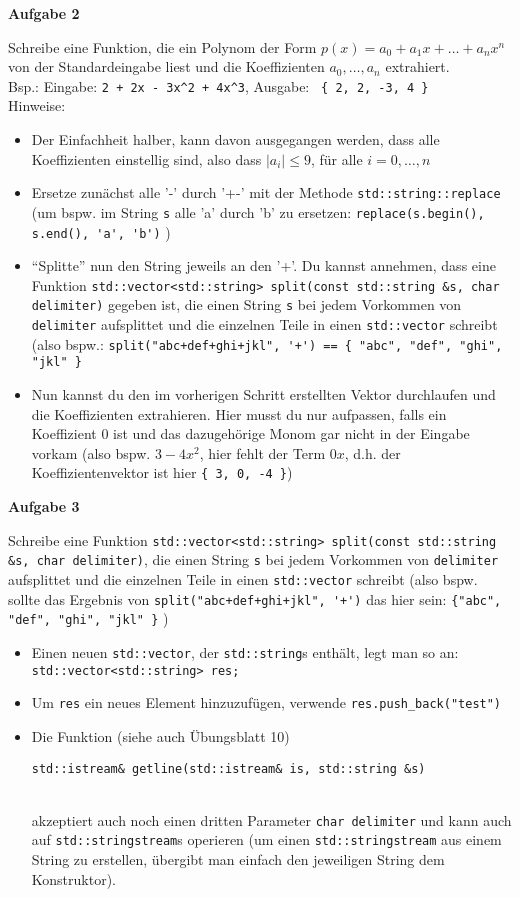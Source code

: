 \documentclass[a4paper,12pt,parskip=full]{scrartcl}
\newcommand{\Aufgabe}[1]{
  {
    \vspace*{0.5cm}
    \textsf{\textbf{Aufgabe #1}}
    \vspace*{0.2cm}
    
  }
}
\begin{document}
\Aufgabe{2} Schreibe eine Funktion, die ein Polynom der Form
$p(x) = a_0 + a_1 x + \dots + a_nx^n$ von der Standardeingabe liest
und die Koeffizienten $a_0, \dots, a_n$ extrahiert. \\
Bsp.: Eingabe: \texttt{2 + 2x - 3x\textasciicircum 2 + 4x\textasciicircum 3}, Ausgabe: \texttt{ \{ 2, 2, -3, 4 \} } \\
Hinweise:
\begin{itemize}
\item Der Einfachheit halber, kann davon ausgegangen werden, dass alle
  Koeffizienten einstellig sind, also dass $|a_i| \le 9$, für alle
  $i=0,\dots,n$
\item Ersetze zunächst alle '-' durch '+-' mit der Methode
  \lstinline{std::string::replace} (um bspw. im String \lstinline{s}
  alle 'a' durch 'b' zu ersetzen: \lstinline{replace(s.begin(), s.end(), 'a', 'b')} )
\item ``Splitte'' nun den String jeweils an den '+'. Du kannst
  annehmen, dass eine Funktion \lstinline{std::vector<std::string> split(const std::string &s, char delimiter)} gegeben ist, die
  einen String \lstinline{s} bei jedem Vorkommen von
  \lstinline{delimiter} aufsplittet und die einzelnen Teile in einen
  \lstinline{std::vector} schreibt (also bspw.:
  \lstinline|split("abc+def+ghi+jkl", '+') == { "abc", "def", "ghi", "jkl" }|
\item Nun kannst du den im vorherigen Schritt erstellten Vektor
  durchlaufen und die Koeffizienten extrahieren. Hier musst du nur
  aufpassen, falls ein Koeffizient 0 ist und das dazugehörige Monom
  gar nicht in der Eingabe vorkam (also bspw. $3 - 4x^2$, hier fehlt
  der Term $0x$, d.h. der Koeffizientenvektor ist hier \texttt{\{ 3,
    0, -4 \}})
\end{itemize}

\Aufgabe{3} Schreibe eine Funktion \lstinline{std::vector<std::string> split(const std::string &s, char delimiter)}, die einen String
\lstinline{s} bei jedem Vorkommen von \lstinline{delimiter}
aufsplittet und die einzelnen Teile in einen \lstinline{std::vector}
schreibt (also bspw. sollte das Ergebnis von
\lstinline|split("abc+def+ghi+jkl", '+')| das hier sein: \lstinline|{"abc", "def", "ghi", "jkl" }| )
\begin{itemize}
\item Einen neuen \lstinline{std::vector}, der \lstinline{std::string}s enthält, legt man so an: \\
  \lstinline{std::vector<std::string> res;}
\item Um \lstinline{res} ein neues Element hinzuzufügen, verwende
  \lstinline{res.push_back("test")}
\item Die Funktion (siehe auch Übungsblatt 10) \\
  \centerline{ \lstinline{std::istream& getline(std::istream& is, std::string &s)} } \\
  akzeptiert auch noch einen dritten Parameter \lstinline{char delimiter} und kann auch auf \lstinline{std::stringstream}s
  operieren (um einen \lstinline{std::stringstream} aus einem String
  zu erstellen, übergibt man einfach den jeweiligen String dem
  Konstruktor).
\end{itemize}
\end{document}
